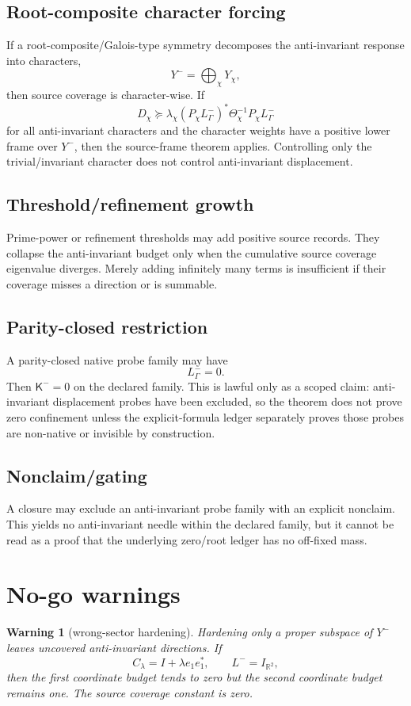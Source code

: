 \documentclass[11pt]{article}
\newtheorem{warning}{Warning}
\begin{document}
\subsection{Root-composite character forcing}
If a root-composite/Galois-type symmetry decomposes the anti-invariant response into characters,
\[
  Y^- = \bigoplus_\chi Y_\chi,
\]
then source coverage is character-wise.  If
\[
  D_\chi\succeq \lambda_\chi (P_\chi L^-_\Gamma)^*\Theta_\chi^{-1}P_\chi L^-_\Gamma
\]
for all anti-invariant characters and the character weights have a positive lower frame over \(Y^-\), then the source-frame theorem applies.  Controlling only the trivial/invariant character does not control anti-invariant displacement.

\subsection{Threshold/refinement growth}
Prime-power or refinement thresholds may add positive source records.  They collapse the anti-invariant budget only when the cumulative source coverage eigenvalue diverges.  Merely adding infinitely many terms is insufficient if their coverage misses a direction or is summable.

\subsection{Parity-closed restriction}
A parity-closed native probe family may have
\[
  L^-_\Gamma=0.
\]
Then \(\mathsf K^-=0\) on the declared family.  This is lawful only as a scoped claim: anti-invariant displacement probes have been excluded, so the theorem does not prove zero confinement unless the explicit-formula ledger separately proves those probes are non-native or invisible by construction.

\subsection{Nonclaim/gating}
A closure may exclude an anti-invariant probe family with an explicit nonclaim.  This yields no anti-invariant needle within the declared family, but it cannot be read as a proof that the underlying zero/root ledger has no off-fixed mass.

\section{No-go warnings}

\begin{warning}[wrong-sector hardening]
Hardening only a proper subspace of \(Y^-\) leaves uncovered anti-invariant directions.  If
\[
  C_\lambda=I+\lambda e_1e_1^*,\qquad L^-=I_{\mathbb R^2},
\]
then the first coordinate budget tends to zero but the second coordinate budget remains one.  The source coverage constant is zero.
\end{warning}
\end{document}
